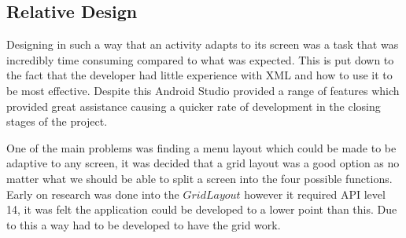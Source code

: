 \subsection{Relative Design}
Designing in such a way that an activity adapts to its screen was a task that was incredibly time consuming compared to what was expected. This is put down to the fact that the developer had little experience with XML and how to use it to be most effective. Despite this Android Studio provided a range of features which provided great assistance causing a quicker rate of development in the closing stages of the project.

One of the main problems was finding a menu layout which could be made to be adaptive to any screen, it was decided that a grid layout was a good option as no matter what we should be able to split a screen into the four possible functions. Early on research was done into the $GridLayout$ however it required API level 14, it was felt the application could be developed to a lower point than this. Due to this a way had to be developed to have the grid work.

